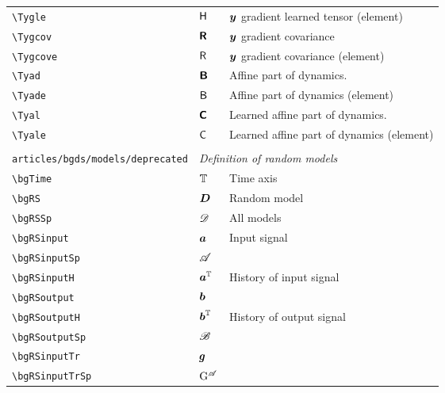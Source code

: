 \begin{longtable}{lll}
 {\color[rgb]{0.5,0.5,0.5}\texttt{\textbackslash Tygle}} & ${\mathsf{H}}$ &  $\boldsymbol{y}$ gradient learned tensor (element)\\ 
 {\color[rgb]{0.5,0.5,0.5}\texttt{\textbackslash Tygcov}} & $\boldsymbol{{\mathsf{R}}}$ &  $\boldsymbol{y}$ gradient covariance\\ 
 {\color[rgb]{0.5,0.5,0.5}\texttt{\textbackslash Tygcove}} & ${\mathsf{R}}$ &  $\boldsymbol{y}$ gradient covariance (element)\\ 
 {\color[rgb]{0.5,0.5,0.5}\texttt{\textbackslash Tyad}} & $\boldsymbol{{\mathsf{B}}}$ &  Affine part of dynamics.\\ 
 {\color[rgb]{0.5,0.5,0.5}\texttt{\textbackslash Tyade}} & ${\mathsf{B}}$ &  Affine part of dynamics (element)\\ 
 {\color[rgb]{0.5,0.5,0.5}\texttt{\textbackslash Tyal}} & $\boldsymbol{{\mathsf{C}}}$ &  Learned affine part of dynamics.\\ 
 {\color[rgb]{0.5,0.5,0.5}\texttt{\textbackslash Tyale}} & ${\mathsf{C}}$ &  Learned affine part of dynamics (element)\\ 
  &  & \\ 
 {\color[rgb]{0.5,0.5,0.5}\texttt{articles/bgds/models/deprecated}} & \multicolumn{2}{l}{\emph{Definition of random models}}\\ 
 \hline
{\color[rgb]{0.5,0.5,0.5}\texttt{\textbackslash bgTime}} & $\mathbb{T}$ &  Time axis\\ 
 {\color[rgb]{0.5,0.5,0.5}\texttt{\textbackslash bgRS}} & $\boldsymbol{D}$ &  Random model\\ 
 {\color[rgb]{0.5,0.5,0.5}\texttt{\textbackslash bgRSSp}} & $\mathscr{D}$ &  All models\\ 
 {\color[rgb]{0.5,0.5,0.5}\texttt{\textbackslash bgRSinput}} & $\boldsymbol{a}$ &  Input signal\\ 
 {\color[rgb]{0.5,0.5,0.5}\texttt{\textbackslash bgRSinputSp}} & $\mathscr{A}$ &  \\ 
 {\color[rgb]{0.5,0.5,0.5}\texttt{\textbackslash bgRSinputH}} & $\boldsymbol{a}^{\mathbb{T}}$ &  History of input signal\\ 
 {\color[rgb]{0.5,0.5,0.5}\texttt{\textbackslash bgRSoutput}} & $\boldsymbol{b}$ & \\ 
 {\color[rgb]{0.5,0.5,0.5}\texttt{\textbackslash bgRSoutputH}} & $\boldsymbol{b}^{\mathbb{T}}$ &  History of output signal\\ 
 {\color[rgb]{0.5,0.5,0.5}\texttt{\textbackslash bgRSoutputSp}} & $\mathscr{B}$ &  \\ 
 {\color[rgb]{0.5,0.5,0.5}\texttt{\textbackslash bgRSinputTr}} & $\boldsymbol{g}$ &  \\ 
 {\color[rgb]{0.5,0.5,0.5}\texttt{\textbackslash bgRSinputTrSp}} & $\mathrm{G}^{\mathscr{A}}$ &  \\ 

\end{longtable}
